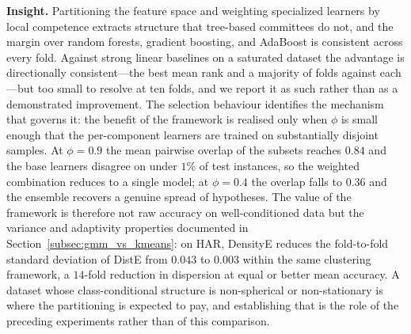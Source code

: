 \documentclass[lettersize,journal]{IEEEtran}
\begin{document}
{{{		\noindent \textbf{Insight.} Partitioning the feature space and weighting specialized learners by local competence extracts structure that tree-based committees do not, and the margin over random forests, gradient boosting, and AdaBoost is consistent across every fold. Against strong linear baselines on a saturated dataset the advantage is directionally consistent---the best mean rank and a majority of folds against each---but too small to resolve at ten folds, and we report it as such rather than as a demonstrated improvement. The selection behaviour identifies the mechanism that governs it: the benefit of the framework is realised only when $\phi$ is small enough that the per-component learners are trained on substantially disjoint samples. At $\phi = 0.9$ the mean pairwise overlap of the subsets reaches $0.84$ and the base learners disagree on under $1\%$ of test instances, so the weighted combination reduces to a single model; at $\phi = 0.4$ the overlap falls to $0.36$ and the ensemble recovers a genuine spread of hypotheses. The value of the framework is therefore not raw accuracy on well-conditioned data but the variance and adaptivity properties documented in Section~\ref{subsec:gmm_vs_kmeans}: on HAR, DensityE reduces the fold-to-fold standard deviation of DistE from $0.043$ to $0.003$ within the same clustering framework, a $14$-fold reduction in dispersion at equal or better mean accuracy. A dataset whose class-conditional structure is non-spherical or non-stationary is where the partitioning is expected to pay, and establishing that is the role of the preceding experiments rather than of this comparison.

}}}
\end{document}
